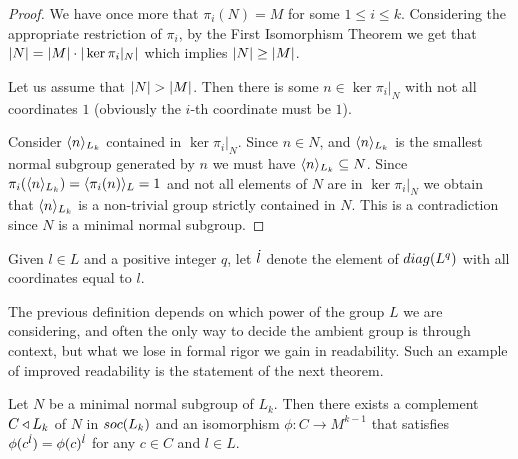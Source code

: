 \begin{proof}
    We have once more that $\pi_i(N) = M$ for some $1 \le i \le k$. Considering the appropriate restriction of $\pi_i$, by the First Isomorphism Theorem we get that $| N | = | M | \cdot | \ker{\pi_i|_{N}} |$ which implies $| N | \geq | M |$.

    Let us assume that $| N | > | M |$. Then there is some $n \in \ker{\pi_i|_{N}}$ with not all coordinates $1$ (obviously the $i$-th coordinate must be $1$).

    Consider $\langle n \rangle_{L_k}$ contained in $\ker{\pi_i|_{N}}$. Since $n \in N$, and $\langle n \rangle_{L_k}$ is the smallest normal subgroup generated by $n$ we must have $\langle n \rangle_{L_k} \subseteq N$. Since $\pi_i(\langle n \rangle_{L_k}) = \langle \pi_i(n) \rangle_{L} = 1$ and not all elements of $N$ are in $\ker{\pi_i|_{N}}$ we obtain that $\langle n \rangle_{L_k}$ is a non-trivial group strictly contained in $N$. This is a contradiction since $N$ is a minimal normal subgroup.
\end{proof}

\begin{definition}
    Given $l \in L$ and a positive integer $q$, let $\dot{l}$ denote the element of $diag({L^q})$ with all coordinates equal to $l$.
\end{definition}

The previous definition depends on which power of the group $L$ we are considering, and often the only way to decide the ambient group is through context, but what we lose in formal rigor we gain in readability. Such an example of improved readability is the statement of the next theorem.

\begin{theorem}
    \label{cplNsoc}
    Let $N$ be a minimal normal subgroup of $L_k$. Then there exists a complement $C \triangleleft L_k$ of $N$ in $soc {(L_k)}$ and an isomorphism $\phi \colon C \rightarrow M^{k-1}$ that satisfies $\phi(c^{\dot{l}}) = \phi(c)^{\dot{l}}$ for any $c \in C$ and $l \in L$.
\end{theorem}

